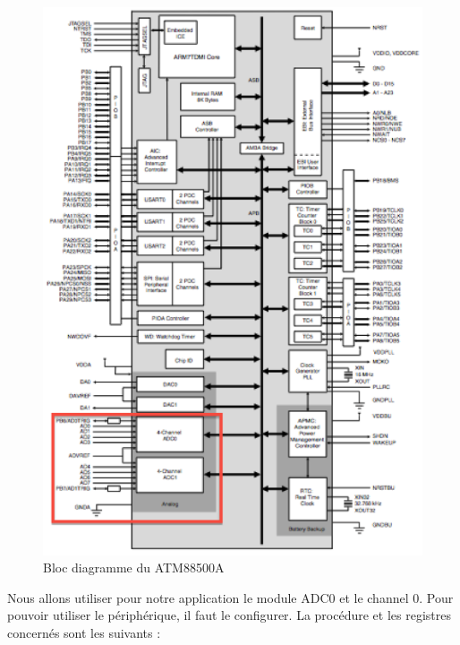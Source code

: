 \documentclass[a4paper]{report}
\begin{document}
\begin{figure}[h!]
	\centering
	\includegraphics[scale=0.6]{images/TEMP_fig4.png}
	\caption{Bloc diagramme du ATM88500A}
\end{figure}

Nous allons utiliser pour notre application le module ADC0 et le channel 0. Pour pouvoir utiliser le périphérique, il faut le configurer. La procédure et les registres concernés sont les suivants :
\end{document}
